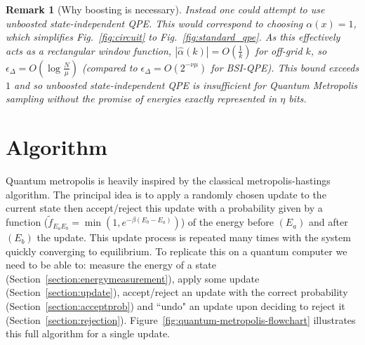 \documentclass[aps,floatfix,10pt,amssymb,amsfont,amsmath,superscriptaddress,float,nofootinbib,longbibliography,nobalancelastpage,twocolumn]{revtex4-2}
\newtheorem{remark}{Remark}
\begin{document}
\begin{remark}[Why boosting is necessary]
Instead one could attempt to use unboosted state-independent QPE. This would correspond to choosing $\alpha(x)=1$, which simplifies Fig.~\ref{fig:circuit} to Fig.~\ref{fig:standard_qpe}. As this effectively acts as a rectangular window function, $|\hat\alpha(k)| = O(\frac{1}{k})$ for off-grid $k$, so $\epsilon_{\Delta} = O(\log \frac{N}{\mu})$ (compared to $\epsilon_{\Delta} = O(2^{-\nu \mu})$ for BSI-QPE). This bound exceeds $1$ and so unboosted state-independent QPE is insufficient for Quantum Metropolis sampling without the promise of energies exactly represented in $\eta$ bits.
\end{remark}
\medskip
\noindent{}
\medskip


\section{Algorithm}
\label{section:algorithm}
Quantum metropolis is heavily inspired by the classical metropolis-hastings algorithm. The principal idea is to apply a randomly chosen update to the current state then accept/reject this update with a probability given by a function ($\tilde{f}_{E_aE_b}=\min(1, e^{-\beta(E_b-E_a)})$) of the energy before $(E_a)$ and after $(E_b)$ the update. This update process is repeated many times with the system quickly converging to equilibrium. To replicate this on a quantum computer we need to be able to: measure the energy of a state (Section~\ref{section:energymeasurement}), apply some update (Section~\ref{section:update}), accept/reject an update with the correct probability (Section~\ref{section:acceptprob}) and ``undo" an update upon deciding to reject it (Section~\ref{section:rejection}). Figure~\ref{fig:quantum-metropolis-flowchart} illustrates this full algorithm for a single update.
\end{document}
